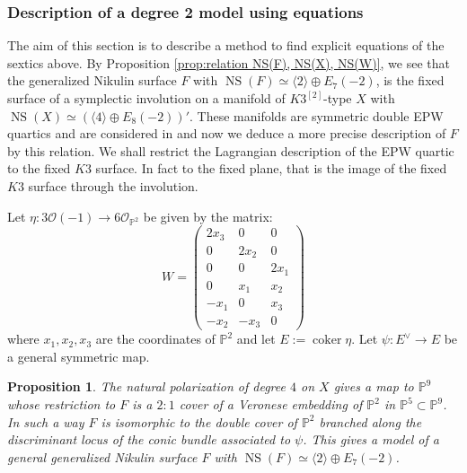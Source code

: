 \documentclass{amsart}
\newtheorem{prop}[thm]{Proposition}
\theoremstyle{definition}
\numberwithin{equation}{section}
\numberwithin{equation}{section} \theoremstyle{definition}
\DeclareMathOperator{\NS}{NS}
\newcommand\PP{{\mathbb{P}}}
\begin{document}
\subsubsection{ Description of a degree 2 model using equations}\label{Verra}
The aim of this section is to describe  a method to find explicit equations of the sextics above. 
By Proposition \ref{prop:relation NS(F), NS(X), NS(W)}, we see that the generalized Nikulin surface $F$ with $\NS(F)\simeq \langle 2\rangle\oplus E_7(-2)$, is the fixed surface of a symplectic involution on a manifold of $K3^{[2]}$-type $X$ with $\NS(X)\simeq \left(\langle 4\rangle\oplus E_8(-2)\right)'$. These manifolds are symmetric double EPW quartics and are considered in \cite[Section 5]{CGKK} and now we deduce a more precise description of $F$ by this relation. We shall restrict the Lagrangian description of the EPW quartic to the fixed $K3$ surface. In fact to the fixed plane, that is the image of the fixed $K3$ surface through the involution.


Let $\eta: 3\mathcal O(-1)\to 6 \mathcal O_{\mathbb P^2}$ be given by the matrix:
\[
W=\left(\begin{array}{ccc}
2x_3 & 0 &0\\
 0& 2x_2 &0\\
0 & 0 &2x_1\\
0 & x_1 & x_2\\
-x_1 & 0 &x_3\\
-x_2 & -x_3 &0
\end{array}
\right)
\]
where $x_1,x_2,x_3$ are the coordinates of $\mathbb P^2$ and let $E:=\operatorname{coker}  \eta$. Let $\psi: E^{\vee}\to E$ be a general symmetric map. 
\begin{prop}\label{degree2}
    The natural polarization of degree $4$ on $X$ gives a map to $\PP^9$ whose restriction 
    to $F$ is a $2:1$ cover of a Veronese embedding of $\PP^2$ in $\PP^5\subset \PP^9$.
    In such a way $F$ is isomorphic to the double cover of $\mathbb P^2$ branched along the discriminant locus of the conic bundle associated to $\psi$. This gives a model of a general generalized Nikulin surface $F$ with $\NS(F)\simeq \langle 2\rangle\oplus E_7(-2)$. %
\end{prop}
\end{document}
